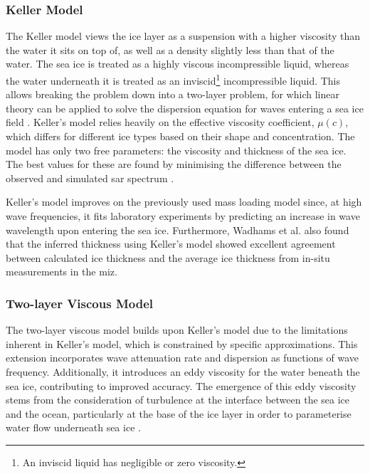 \subsubsection{Keller Model} \label{subsubsec:litReview.sarCharac.seaIceWaveModelling.Keller}

The Keller model \cite{Keller1998} views the ice layer as a suspension with a higher viscosity than the water it sits on top of, as well as a density slightly less than that of the water. The sea ice is treated as a highly viscous incompressible liquid, whereas the water underneath it is treated as an inviscid\footnote{An inviscid liquid has negligible or zero viscosity.} incompressible liquid. This allows breaking the problem down into a two-layer problem, for which linear theory can be applied to solve the dispersion equation for waves entering a sea ice field \cite{Keller1998}. Keller's model relies heavily on the effective viscosity coefficient, $\mu(c)$, which differs for different ice types based on their shape and concentration. The model has only two free parameters: the viscosity and thickness of the sea ice. The best values for these are found by minimising the difference between the observed and simulated \acs{sar} spectrum \cite{Wadhams2004}.

Keller's model improves on the previously used mass loading model since, at high wave frequencies, it fits laboratory experiments by predicting an increase in wave wavelength upon entering the sea ice. Furthermore, Wadhams et al. \cite{Wadhams2004} also found that the inferred thickness using Keller's model showed excellent agreement between calculated ice thickness and the average ice thickness from in-situ measurements in the \acs{miz}.

\subsubsection{Two-layer Viscous Model} \label{subsubsec:litReview.sarCharac.seaIceWaveModelling.twoLayer}

The two-layer viscous model \cite{DeCarolis2002} builds upon Keller's model due to the limitations inherent in Keller's model, which is constrained by specific approximations. This extension incorporates wave attenuation rate and dispersion as functions of wave frequency. Additionally, it introduces an eddy viscosity for the water beneath the sea ice, contributing to improved accuracy. The emergence of this eddy viscosity stems from the consideration of turbulence at the interface between the sea ice and the ocean, particularly at the base of the ice layer in order to parameterise water flow underneath sea ice \cite{DeCarolis2002,DeSanti2018}.

